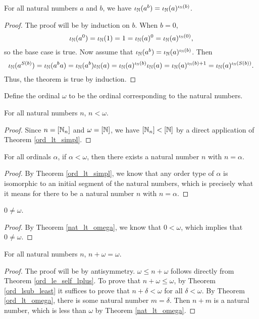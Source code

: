 \documentclass[../../math.tex]{subfiles}
\begin{document}
\begin{theorem} \label{from_nat_ord_pow}
    For all natural numbers $a$ and $b$, we have $\iota_{\mathbb{N}}(a^b) = \iota_{\mathbb{N}}(a)^{\iota_{\mathbb{N}}(b)}$.
\end{theorem}
\begin{proof}
    The proof will be by induction on $b$.  When $b = 0$,
    \[
        \iota_{\mathbb{N}}(a^0) = \iota_{\mathbb{N}}(1) = 1 = \iota_{\mathbb{N}}(a)^0 = \iota_{\mathbb{N}}(a)^{\iota_{\mathbb{N}}(0)},
    \]
    so the base case is true.  Now assume that $\iota_{\mathbb{N}}(a^b) = \iota_{\mathbb{N}}(a)^{\iota_{\mathbb{N}}(b)}$.
    Then
    \[
        \iota_{\mathbb{N}}(a^{S(b)})
        = \iota_{\mathbb{N}}(a^ba)
        = \iota_{\mathbb{N}}(a^b)\iota_{\mathbb{N}}(a)
        = \iota_{\mathbb{N}}(a)^{\iota_{\mathbb{N}}(b)} \iota_{\mathbb{N}}(a)
        = \iota_{\mathbb{N}}(a)^{\iota_{\mathbb{N}}(b) + 1}
        = \iota_{\mathbb{N}}(a)^{\iota_{\mathbb{N}}(S(b))}.
    \]
    Thus, the theorem is true by induction.
\end{proof}

\begin{definition}
    Define the ordinal $\omega$ to be the ordinal corresponding to the natural
    numbers.
\end{definition}

\begin{theorem} \label{nat_lt_omega}
    For all natural numbers $n$, $n < \omega$.
\end{theorem}
\begin{proof}
    Since $n = [\mathbb{N}_n]$ and $\omega = [\mathbb{N}]$, we have $[\mathbb{N}_n] < [\mathbb{N}]$ by a direct
    application of Theorem \ref{ord_lt_simpl}.
\end{proof}

\begin{theorem} \label{ord_lt_omega}
    For all ordinals $\alpha$, if $\alpha < \omega$, then there exists a natural
    number $n$ with $n = \alpha$.
\end{theorem}
\begin{proof}
    By Theorem \ref{ord_lt_simpl}, we know that any order type of $\alpha$ is
    isomorphic to an initial segment of the natural numbers, which is precisely
    what it means for there to be a natural number $n$ with $n = \alpha$.
\end{proof}

\begin{theorem} \label{omega_nz}
    $0 \neq \omega$.
\end{theorem}
\begin{proof}
    By Theorem \ref{nat_lt_omega}, we know that $0 < \omega$, which implies that
    $0 \neq \omega$.
\end{proof}

\begin{theorem} \label{nat_plus_omega}
    For all natural numbers $n$, $n + \omega = \omega$.
\end{theorem}
\begin{proof}
    The proof will be by antisymmetry.  $\omega \leq n + \omega$ follows
    directly from Theorem \ref{ord_le_self_lplus}.  To prove that $n + \omega
    \leq \omega$, by Theorem \ref{ord_lsub_least} it suffices to prove that $n +
    \delta < \omega$ for all $\delta < \omega$.  By Theorem \ref{ord_lt_omega},
    there is some natural number $m = \delta$.  Then $n + m$ is a natural
    number, which is less than $\omega$ by Theorem \ref{nat_lt_omega}.
\end{proof}
\end{document}
